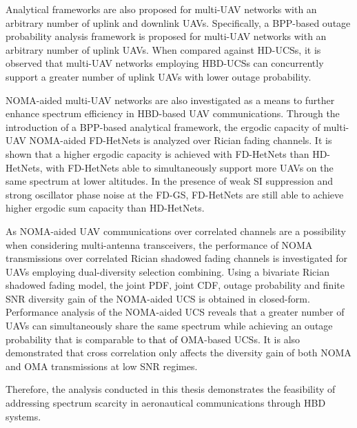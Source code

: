 Analytical frameworks are also proposed for multi-UAV networks with an arbitrary number of uplink and downlink UAVs. Specifically, a BPP-based outage probability analysis framework is proposed for multi-UAV networks with an arbitrary number of uplink UAVs. When compared against HD-UCSs, it is observed that multi-UAV networks employing HBD-UCSs can concurrently support a greater number of uplink UAVs with lower outage probability.

NOMA-aided multi-UAV networks are also investigated as a means to further enhance spectrum efficiency in HBD-based UAV communications. Through the introduction of a BPP-based analytical framework, the ergodic capacity of multi-UAV NOMA-aided FD-HetNets is analyzed over Rician fading channels. It is shown that a higher ergodic capacity is achieved with FD-HetNets than HD-HetNets, with FD-HetNets able to simultaneously support more UAVs on the same spectrum at lower altitudes. In the presence of weak SI suppression and strong oscillator phase noise at the FD-GS, FD-HetNets are still able to achieve higher ergodic sum capacity than HD-HetNets.

As NOMA-aided UAV communications over correlated channels are a possibility when considering multi-antenna transceivers, the performance of NOMA transmissions over correlated Rician shadowed fading channels is investigated for UAVs employing dual-diversity selection combining. Using a bivariate Rician shadowed fading model, the joint PDF, joint CDF, outage probability and finite SNR diversity gain of the NOMA-aided UCS is obtained in closed-form. Performance analysis of the NOMA-aided UCS reveals that a greater number of UAVs can simultaneously share the same spectrum while achieving an outage probability that is comparable to \textcolor{black}{that of} OMA-based UCSs. It is also demonstrated that cross correlation only affects the diversity gain of both NOMA and OMA transmissions at low SNR regimes.

Therefore, the analysis conducted in this thesis demonstrates the feasibility of addressing spectrum scarcity in aeronautical communications through HBD systems.
















